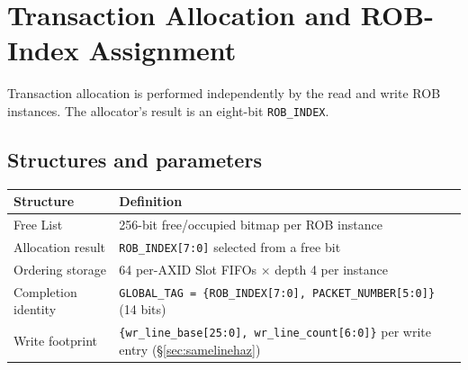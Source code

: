 \section{Transaction Allocation and ROB-Index Assignment}
\label{sec:allocator}

Transaction allocation is performed independently by the read and write ROB
instances.  The allocator's result is an eight-bit \texttt{ROB\_INDEX}.

\subsection{Structures and parameters}
\begin{center}
\begin{tabular}{ll}
\toprule
\textbf{Structure} & \textbf{Definition}\\
\midrule
Free List & 256-bit free/occupied bitmap per ROB instance\\
Allocation result & \texttt{ROB\_INDEX[7:0]} selected from a free bit\\
Ordering storage & 64 per-AXID Slot FIFOs $\times$ depth 4 per instance\\
Completion identity & \texttt{GLOBAL\_TAG = \{ROB\_INDEX[7:0], PACKET\_NUMBER[5:0]\}} (14 bits)\\
Write footprint & \texttt{\{wr\_line\_base[25:0], wr\_line\_count[6:0]\}} per write entry (\S\ref{sec:samelinehaz})\\
\bottomrule
\end{tabular}
\end{center}


